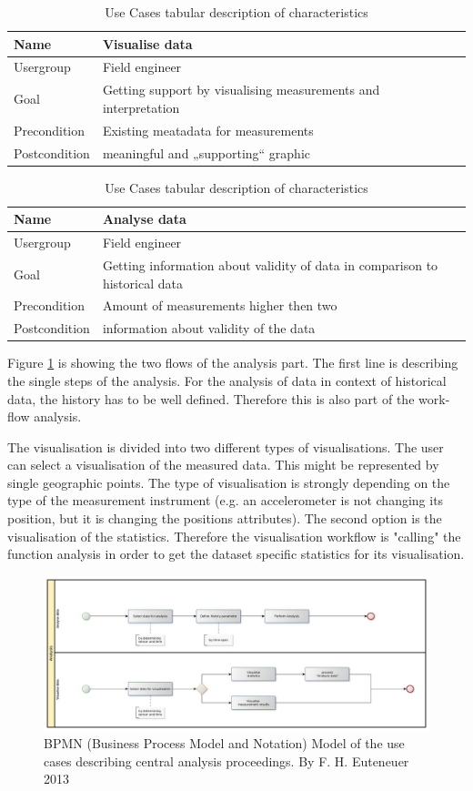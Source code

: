 \begin{table}[H]
\centering
\begin{tabular}{l | p{11cm}}
Name & Visualise data\\ \hline 
Usergroup & Field engineer\\ \hline 
Goal & Getting support by visualising measurements and interpretation\\ \hline 
Precondition & Existing meatadata for measurements\\ \hline 
Postcondition & meaningful and „supporting“ graphic\\
\end{tabular}
\caption{Use Cases tabular description of characteristics} 
\label{table:use case description "Visualise data"}
\end{table}

\begin{table}[H]
\centering
\begin{tabular}{l | p{11cm}}
Name & Analyse data\\ \hline 
Usergroup & Field engineer\\ \hline 
Goal & Getting information about validity of data in comparison to historical data\\ \hline 
Precondition & Amount of measurements higher then two\\ \hline 
Postcondition & information about validity of the data\\ 
\end{tabular}
\caption{Use Cases tabular description of characteristics} 
\label{table:use case description of "Analyse data"}
\end{table}

Figure \ref{fig:bpmn_use-case_analysis} is showing the two flows of the analysis part. The first line is describing the single steps of the analysis. For the analysis of data in context of historical data, the history has to be well defined. Therefore this is also part of the work-flow analysis.

The visualisation is divided into two different types of visualisations. The user can select a visualisation of the measured data. This might be represented by single geographic points. The type of visualisation is strongly depending on the type of the measurement instrument (e.g. an accelerometer is not changing its position, but it is changing the positions attributes). The second option is the visualisation of the statistics. Therefore the visualisation workflow is "calling" the function analysis in order to get the dataset specific statistics for its visualisation.

\begin{figure}[H]
	\centering
 	 \includegraphics[scale=0.24]{graphics/bpmn_use-cases_analysis.jpg} 
	\caption{BPMN (Business Process Model and Notation) Model of the use cases describing central analysis proceedings. By F. H. Euteneuer 2013}
	 \label{fig:bpmn_use-case_analysis}
\end{figure}




